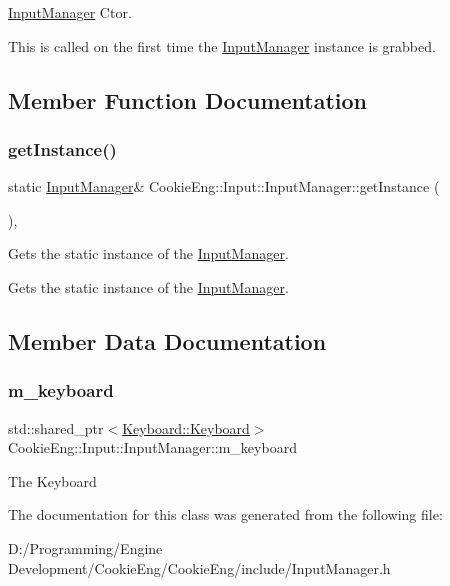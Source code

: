 \hyperlink{class_cookie_eng_1_1_input_1_1_input_manager}{Input\+Manager} Ctor. 

This is called on the first time the \hyperlink{class_cookie_eng_1_1_input_1_1_input_manager}{Input\+Manager} instance is grabbed. 

\subsection{Member Function Documentation}
\mbox{\label{class_cookie_eng_1_1_input_1_1_input_manager_a0ae972a3fda8747b2b9cc6bb9417dfa8}} 
\subsubsection{\texorpdfstring{get\+Instance()}{getInstance()}}
{\footnotesize\ttfamily static \hyperlink{class_cookie_eng_1_1_input_1_1_input_manager}{Input\+Manager}\& Cookie\+Eng\+::\+Input\+::\+Input\+Manager\+::get\+Instance (\begin{DoxyParamCaption}{ }\end{DoxyParamCaption})\hspace{0.3cm}{\ttfamily [inline]}, {\ttfamily [static]}}



Gets the static instance of the \hyperlink{class_cookie_eng_1_1_input_1_1_input_manager}{Input\+Manager}. 

Gets the static instance of the \hyperlink{class_cookie_eng_1_1_input_1_1_input_manager}{Input\+Manager}. 

\subsection{Member Data Documentation}
\mbox{\label{class_cookie_eng_1_1_input_1_1_input_manager_aa8137e98a8515c6da82cd3ca4f2f04bf}} 
\subsubsection{\texorpdfstring{m\+\_\+keyboard}{m\_keyboard}}
{\footnotesize\ttfamily std\+::shared\+\_\+ptr$<$\hyperlink{class_cookie_eng_1_1_input_1_1_keyboard_1_1_keyboard}{Keyboard\+::\+Keyboard}$>$ Cookie\+Eng\+::\+Input\+::\+Input\+Manager\+::m\+\_\+keyboard\hspace{0.3cm}{\ttfamily [protected]}}

The Keyboard 

The documentation for this class was generated from the following file\+:\begin{DoxyCompactItemize}
\item 
D\+:/\+Programming/\+Engine Development/\+Cookie\+Eng/\+Cookie\+Eng/include/Input\+Manager.\+h\end{DoxyCompactItemize}
